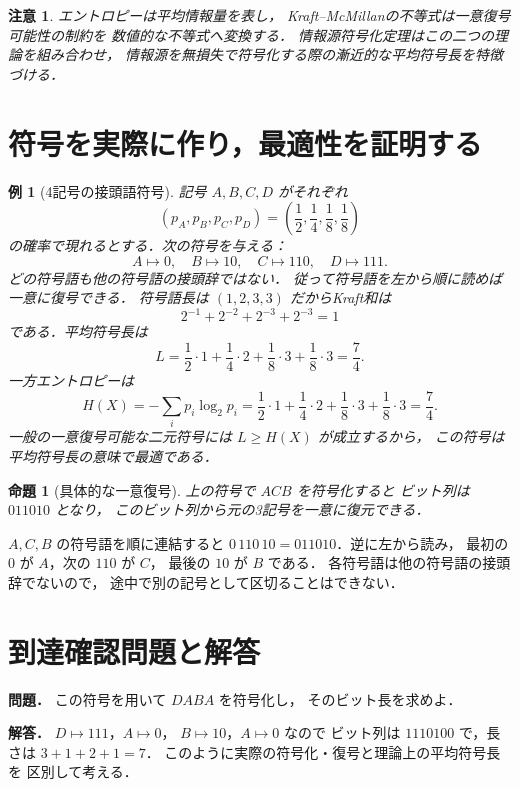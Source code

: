 \documentclass[a5paper,10pt,onecolumn]{jsarticle}
\makeatletter
\theoremstyle{mathnotetheorem}
\newtheorem{proposition}[theorem]{命題}
\newtheorem{example}[theorem]{例}
\newtheorem{remark}[theorem]{注意}
\renewcommand{\proofname}{証明}
\renewenvironment{proof}[1][\proofname]{%
  \par\pushQED{\qed}\normalfont\topsep4\p@\@plus2\p@\relax
  \trivlist\item[\hskip\labelsep\bfseries #1]\ignorespaces
}{\popQED\endtrivlist\@endpefalse}
\makeatother
\begin{document}
\begin{remark}
エントロピーは平均情報量を表し，
Kraft--McMillanの不等式は一意復号可能性の制約を
数値的な不等式へ変換する．
情報源符号化定理はこの二つの理論を組み合わせ，
情報源を無損失で符号化する際の漸近的な平均符号長を特徴づける．
\end{remark}


\section{符号を実際に作り，最適性を証明する}
\begin{example}[4記号の接頭語符号]
記号 $A,B,C,D$ がそれぞれ
\[
 (p_A,p_B,p_C,p_D)
 =\left(\frac12,\frac14,\frac18,\frac18\right)
\]
の確率で現れるとする．次の符号を与える：
\[
 A\mapsto0,\quad B\mapsto10,\quad
 C\mapsto110,\quad D\mapsto111.
\]
どの符号語も他の符号語の接頭辞ではない．
従って符号語を左から順に読めば一意に復号できる．
符号語長は $(1,2,3,3)$ だからKraft和は
\[
 2^{-1}+2^{-2}+2^{-3}+2^{-3}=1
\]
である．平均符号長は
\[
 L=\frac12\cdot1+\frac14\cdot2
   +\frac18\cdot3+\frac18\cdot3=\frac74.
\]
一方エントロピーは
\[
 H(X)=-\sum_i p_i\log_2p_i
 =\frac12\cdot1+\frac14\cdot2
  +\frac18\cdot3+\frac18\cdot3=\frac74.
\]
一般の一意復号可能な二元符号には
$L\ge H(X)$ が成立するから，
この符号は平均符号長の意味で最適である．
\end{example}
\begin{proposition}[具体的な一意復号]
上の符号で $ACB$ を符号化すると
ビット列は $011010$ となり，
このビット列から元の3記号を一意に復元できる．
\end{proposition}
\begin{proof}
$A,C,B$ の符号語を順に連結すると
$0\,110\,10=011010$．逆に左から読み，
最初の $0$ が $A$，次の $110$ が $C$，
最後の $10$ が $B$ である．
各符号語は他の符号語の接頭辞でないので，
途中で別の記号として区切ることはできない．
\end{proof}
\section*{到達確認問題と解答}
\noindent\textbf{問題．}
この符号を用いて $DABA$ を符号化し，
そのビット長を求めよ．

\medskip\noindent\textbf{解答．}
$D\mapsto111$，$A\mapsto0$，
$B\mapsto10$，$A\mapsto0$ なので
ビット列は $1110100$ で，長さは $3+1+2+1=7$．
このように実際の符号化・復号と理論上の平均符号長を
区別して考える．
\end{document}

